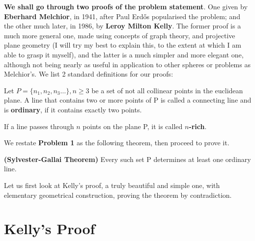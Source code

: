 \documentclass{article}
\begin{document}
\noindent \textbf{We shall go through two proofs of the problem statement}. One given by \textbf{Eberhard Melchior}, in 1941, after Paul Erdős popularised the problem; and the other much later, in 1986, by \textbf{Leroy Milton Kelly}. The former proof is a much more general one, made using concepts of graph theory, and projective plane geometry (I will try my best to explain this, to the extent at which I am able to grasp it myself), and the latter is a much simpler and more elegant one, although not being nearly as useful in application to other spheres or problems as Melchior's. \newline
\text{ }\newline
\text{ }\newline
\text{ }\newline
\text{ }\newline\text{ }\newline
We list 2 standard definitions for our proofs:

\begin{defin}
    Let $P = \{n_{1},n_{2},n_{3}\dots\}, n \ge 3$ be a set of not all collinear points in the euclidean plane. A line that contains two or more points of P is called a connecting line and is \textbf{ordinary}, if it contains exactly two points.

\end{defin}

\begin{defin}
    If a line passes through $n$ points on the plane P, it is called \textbf{$n$-rich}.
\end{defin}

We restate \textbf{Problem 1} as the following theorem, then proceed to prove it.

\begin{Theor}
    \textbf{(Sylvester-Gallai Theorem) }Every such set P determines at least one ordinary line.
\end{Theor}

\text{ }\newline
Let us first look at Kelly's proof, a truly beautiful and simple one, with elementary geometrical construction, proving the theorem by contradiction.
\section{Kelly's Proof}
\end{document}
